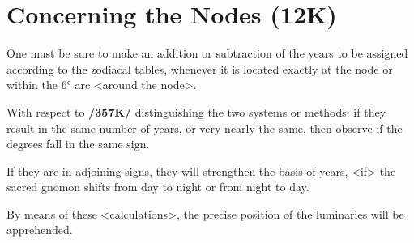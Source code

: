 \section{Concerning the Nodes (12K)}
One must be sure to make an addition or subtraction of the years to be assigned according to the zodiacal tables, whenever it is located exactly at the node or within the 6° arc <around the node>. 

With respect to \textbf{/357K/} distinguishing the two systems or methods: if they result in the same number of years, or very nearly the same, then observe if the degrees fall in the same sign. 

If they are in adjoining signs, they will strengthen the basis of years, <if> the sacred gnomon shifts from day to night or from night to day.

By means of these <calculations>, the precise position of the luminaries will be apprehended.

\newpage